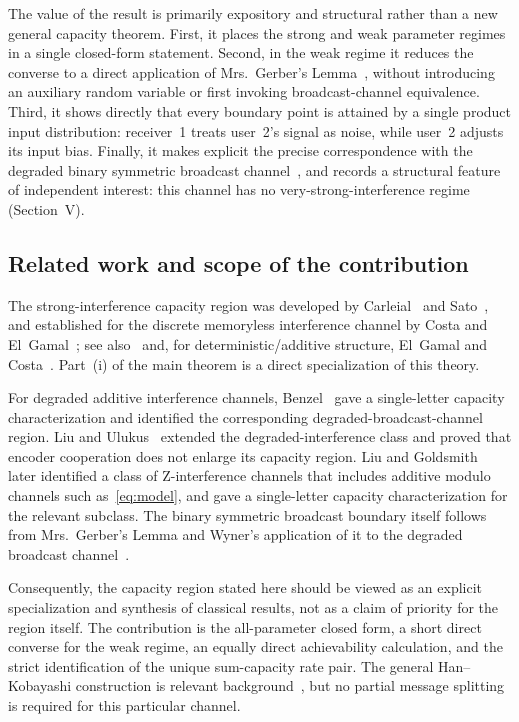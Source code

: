 \documentclass[12pt,draftclsnofoot,onecolumn,conference]{IEEEtran}
\begin{document}
The value of the result is primarily expository and structural rather than a
new general capacity theorem. First, it places the strong and weak parameter
regimes in a single closed-form statement. Second, in the weak regime it
reduces the converse to a direct application of Mrs.~Gerber's
Lemma~\cite{WZ73a}, without introducing an auxiliary random variable or
first invoking broadcast-channel equivalence. Third, it shows directly that
every boundary point is attained by a single product input distribution:
receiver~1 treats user~2's signal as noise, while user~2 adjusts its input
bias. Finally, it makes explicit the precise correspondence with the
degraded binary symmetric broadcast channel~\cite{Wyner73b}, and records a
structural feature of independent interest: this channel has no
very-strong-interference regime (Section~V).

\subsection{Related work and scope of the contribution}

The strong-interference capacity region was developed by
Carleial~\cite{Carleial75} and Sato~\cite{Sato78,Sato81}, and established for
the discrete memoryless interference channel by Costa and
El~Gamal~\cite{CEG87}; see also~\cite[Ch.~6]{EGK11} and, for
deterministic/additive structure, El~Gamal and Costa~\cite{EGC82}. Part~(i)
of the main theorem is a direct specialization of this theory.

For degraded additive interference channels, Benzel~\cite{Benzel79} gave a
single-letter capacity characterization and identified the corresponding
degraded-broadcast-channel region. Liu and Ulukus~\cite{LU08} extended the
degraded-interference class and proved that encoder cooperation does not
enlarge its capacity region. Liu and Goldsmith~\cite{LG09} later identified
a class of Z-interference channels that includes additive modulo channels
such as~\eqref{eq:model}, and gave a single-letter capacity characterization
for the relevant subclass. The binary symmetric broadcast boundary itself
follows from Mrs.~Gerber's Lemma and Wyner's application of it to the
degraded broadcast channel~\cite{WZ73a,Wyner73b}.

Consequently, the capacity region stated here should be viewed as an explicit
specialization and synthesis of classical results, not as a claim of
priority for the region itself. The contribution is the all-parameter closed
form, a short direct converse for the weak regime, an equally direct
achievability calculation, and the strict identification of the unique
sum-capacity rate pair. The general Han--Kobayashi construction is relevant
background~\cite{HK81}, but no partial message splitting is required for
this particular channel.
\end{document}
